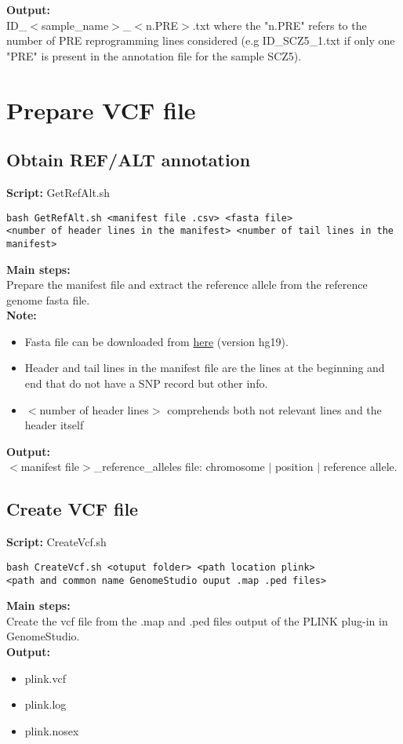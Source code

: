 \documentclass[11pt]{paper}
\begin{document}
\noindent \textbf{Output:}{\small\\
ID\_$<$sample\_name$>$\_$<$n.PRE$>$.txt where the "n.PRE" refers to the number of PRE reprogramming lines considered (e.g ID\_SCZ5\_1.txt if only one "PRE" is present in the annotation file for the sample SCZ5).}

\section{Prepare VCF file}
\subsection{Obtain REF/ALT annotation}
\textbf{Script:} GetRefAlt.sh
\begin{verbatim}
bash GetRefAlt.sh <manifest file .csv> <fasta file> 
<number of header lines in the manifest> <number of tail lines in the manifest>
\end{verbatim}
\textbf{Main steps:}\\
Prepare the manifest file and extract the reference allele from the reference genome fasta file.\\
\noindent\textbf{Note:}\\
\vspace{-0.5cm}
\begin{itemize}
\item Fasta file can be downloaded from \href{https://software.broadinstitute.org/gatk/download/bundle}{here} (version hg19).
\item Header and tail lines in the manifest file are the lines at the beginning and end that do not have a SNP record but other info.
\item $<$number of header lines$>$ comprehends both not relevant lines and the header itself 
\end{itemize}
\noindent\textbf{Output:}\\
$<$manifest file$>$\_reference\_alleles file: chromosome $|$ position $|$ reference allele.

\subsection{Create VCF file}
\textbf{Script:} CreateVcf.sh
\begin{verbatim}
bash CreateVcf.sh <otuput folder> <path location plink> 
<path and common name GenomeStudio ouput .map .ped files> 
\end{verbatim}
\textbf{Main steps:}\\
Create the vcf file from the .map and .ped files output of the PLINK plug-in in GenomeStudio.\\
\noindent\textbf{Output:}\\
\vspace{-0.5 cm}
\begin{itemize}
\item plink.vcf
\item plink.log 
\item plink.nosex
\end{itemize}
\end{document}
